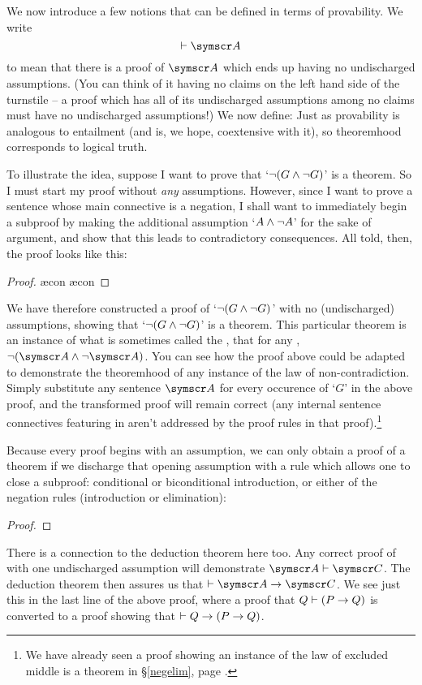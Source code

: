 We now introduce a few notions that can be defined in terms of provability. We write
$$\proves \meta{A}$$
to mean that there is a proof of $\meta{A}$ which ends up having no undischarged assumptions. (You can think of it having no claims on the left hand side of the turnstile – a proof which has all of its undischarged assumptions among no claims must have no undischarged assumptions!) We now define:
Just as provability is analogous to entailment (and is, we hope, coextensive with it), so theoremhood corresponds to logical truth. 

To illustrate the idea, suppose I want to prove that `$\neg (G \wedge \neg G)$' is a theorem. So I must start my proof without \emph{any} assumptions. However, since I want to prove a sentence whose main connective is a negation, I shall want to  immediately begin a subproof by making the additional assumption `$A \wedge \neg A$' for the sake of argument, and show that this leads to contradictory consequences. All told, then, the proof looks like this:
	\begin{proof}
		\open
			\ae{con}
			\ae{con}
		\close
	\end{proof}
We have therefore constructed a proof of `$\neg (G \wedge \neg G)$' with no (undischarged) assumptions, showing that `$\neg (G \wedge \neg G)$' is a theorem. This particular theorem is an instance of what is sometimes called the , that for any , $\enot(\meta{A}\eand\enot\meta{A})$. You can see how the proof above could be adapted to demonstrate the theoremhood of any instance of the law of non-contradiction. Simply substitute any sentence $\meta{A}$ for every occurence of `$G$' in the above proof, and the transformed proof will remain correct (any internal sentence connectives featuring in  aren't addressed by the proof rules in that proof).\footnote{We have already seen a proof showing an instance of the law of excluded middle is a theorem in §\ref{negelim}, page \pageref{excmidd}.}

Because every proof begins with an assumption, we can only obtain a proof of a theorem if we discharge that opening assumption with a rule which allows one to close a subproof: conditional or biconditional introduction, or either of the negation rules (introduction or elimination): 
  \begin{proof}
    \open
    \open
    \open
    \close
    \close
    \close
  \end{proof}
There is a connection to the deduction theorem here too. Any correct proof of  with one undischarged assumption  will demonstrate $\meta{A}\proves\meta{C}$. The deduction theorem then assures us that $\proves \meta{A}\eif\meta{C}$. We see just this in the last line of the above proof, where a proof that $Q \vdash (P \rightarrow Q)$ is converted to a proof showing that $\vdash Q \rightarrow (P \rightarrow Q)$.

